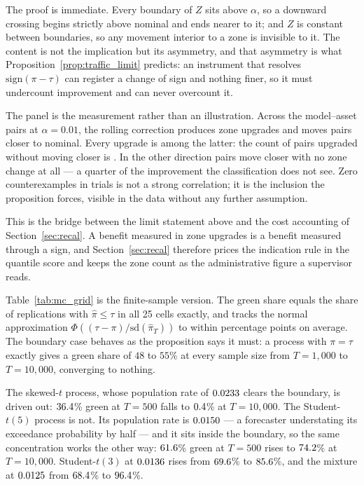 The proof is immediate. Every boundary of $Z$ sits above $\alpha$, so a downward
crossing begins strictly above nominal and ends nearer to it; and $Z$ is constant
between boundaries, so any movement interior to a zone is invisible to it. The
content is not the implication but its asymmetry, and that asymmetry is what
Proposition~\ref{prop:traffic_limit} predicts: an instrument that resolves
$\mathrm{sign}(\pi - \tau)$ can register a change of sign and nothing finer, so it
must undercount improvement and can never overcount it.

The panel is the measurement rather than an illustration. Across the
\nZoneCells{} model--asset pairs at $\alpha = 0.01$, the rolling correction
produces \nZoneUpgrades{} zone upgrades and moves \nZoneCloser{} pairs closer to
nominal. Every upgrade is among the latter: the count of pairs upgraded without
moving closer is \nZoneUpNotCloser{}. In the other direction \nZoneCloserNotUp{}
pairs move closer with no zone change at all --- a quarter of the improvement the
classification does not see. Zero counterexamples in \nZoneUpgrades{} trials is
not a strong correlation; it is the inclusion the proposition forces, visible in
the data without any further assumption.

This is the bridge between the limit statement above and the cost accounting of
Section~\ref{sec:recal}. A benefit measured in zone upgrades is a benefit
measured through a sign, and Section~\ref{sec:recal} therefore prices the
indication rule in the quantile score and keeps the zone count as the
administrative figure a supervisor reads.

Table~\ref{tab:mc_grid} is the finite-sample version. The green share equals the
share of replications with $\hat\pi\le\tau$ in all 25 cells exactly, and tracks
the normal approximation
$\Phi\!\left((\tau-\pi)/\mathrm{sd}(\hat\pi_T)\right)$ to within \nMCNormalApproxPP{} percentage points on average. The boundary case behaves as the proposition says it must: a
process with $\pi = \tau$ exactly gives a green share of $48$ to $55$\% at every
sample size from $T = 1{,}000$ to $T = 10{,}000$, converging to nothing.

The skewed-$t$ process, whose population rate of $0.0233$ clears the boundary, is
driven out: $36.4$\% green at $T = 500$ falls to $0.4$\% at $T = 10{,}000$. The
Student-$t(5)$ process is not. Its population rate is $0.0150$ --- a forecaster
understating its exceedance probability by half --- and it sits inside the
boundary, so the same concentration works the other way: $61.6$\% green at $T = 500$ rises to $74.2$\% at $T = 10{,}000$. Student-$t(3)$ at $0.0136$ rises from $69.6$\% to $85.6$\%, and the mixture at $0.0125$ from $68.4$\% to $96.4$\%.

